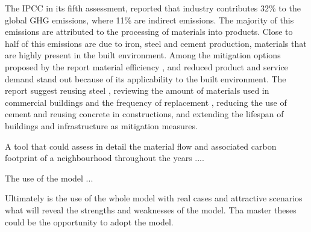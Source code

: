 The IPCC in its fifth assessment, \cite{IPCCIndustry} reported that industry contributes 32\% to the global GHG emissions, where 11\% are indirect emissions. The majority of this emissions are attributed to the processing of materials into products. Close to half of this emissions are due to iron, steel and cement production, materials that are highly present in the built environment. Among the mitigation options proposed by the report material efficiency , and reduced product and service demand  stand out because of its applicability to the built environment. The report suggest reusing steel \cite{Cooper2012}, reviewing the amount of materials used in commercial buildings and the frequency of replacement \cite{IPCCIndustry}, reducing the use of cement and reusing concrete in constructions, and extending the lifespan of buildings and infrastructure as mitigation measures. 

A tool that could assess in detail the material flow and associated carbon footprint of a neighbourhood throughout the years ....



The use of the model ...


Ultimately is the use of the whole model with real cases and attractive scenarios what will reveal the strengths and weaknesses of the model. Tha master theses could be the opportunity to adopt the model. 


\\ 
\\





